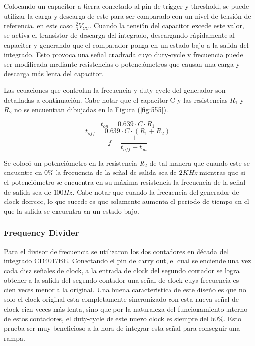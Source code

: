 Colocando un capacitor a tierra conectado al pin de trigger y threshold, se puede utilizar la carga y descarga de este para ser comparado con un nivel de tensión de referencia, en este caso $\frac{2}{3} V_{CC}$. Cuando la tensión del capacitor excede este valor, se activa el transistor de descarga del integrado, descargando rápidamente al capacitor y generando que el comparador ponga en un estado bajo a la salida del integrado. Esto provoca una señal cuadrada cuyo duty-cycle y frecuencia puede ser modificada mediante resistencias o potenciómetros que causan una carga y descarga más lenta del capacitor. 

Las ecuaciones que controlan la frecuencia y duty-cycle del generador son detalladas a continuación. Cabe notar que el capacitor C y las resistencias $R_1$ y $R_2$ no se encuentran dibujadas en la Figura (\ref{fig:555}).

\begin{equation}
t_{on} = 0.639\cdot C \cdot R_1
\end{equation}
\begin{equation}
t_{off} = 0.639 \cdot C \cdot (R_1 + R_2)
\end{equation}
\begin{equation}
f=\frac{1}{t_{off} + t_{on}}
\end{equation}

Se colocó un potenciómetro en la resistencia $R_2$ de tal manera que cuando este se encuentre en $0\%$ la frecuencia de la señal de salida sea de $2KHz$ mientras que si el potenciómetro se encuentra en su máxima resistencia la frecuencia de la señal de salida sea de $100Hz$. Cabe notar que cuando la frecuencia del generador de clock decrece, lo que sucede es que solamente aumenta el periodo de tiempo en el que la salida se encuentra en un estado bajo.

\subsubsection{Frequency Divider}

Para el divisor de frecuencia se utilizaron los dos contadores en década del integrado \href{http://www.ti.com/lit/ds/symlink/cd4017b.pdf}{CD4017BE}. Conectando el pin de carry out, el cual se enciende una vez cada diez señales de clock, a la entrada de clock del segundo contador se logra obtener a la salida del segundo contador una señal de clock cuya frecuencia es cien veces menor a la original. Una buena característica de este diseño es que no solo el clock original esta completamente sincronizado con esta nueva señal de clock cien veces más lenta, sino que por la naturaleza del funcionamiento interno de estos contadores, el duty-cycle de este nuevo clock es siempre del $50\%$. Esto prueba ser muy beneficioso a la hora de integrar esta señal para conseguir una rampa.

